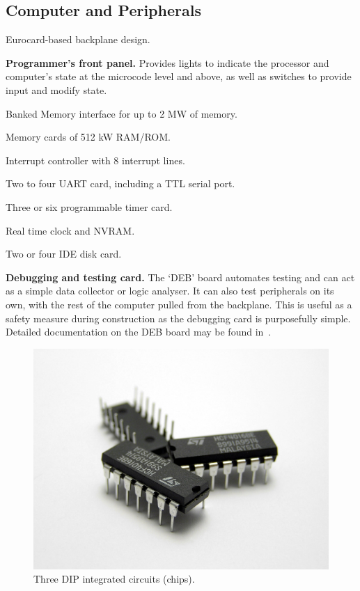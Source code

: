 \subsection{Computer and Peripherals}

\begin{description}
\item Eurocard-based backplane design.
\item \textbf{Programmer's front panel.} Provides lights to indicate
  the processor and computer's state at the microcode level and above,
  as well as switches to provide input and modify state.
\item Banked Memory interface for up to 2 MW of memory.
\item Memory cards of 512 kW RAM/ROM.
\item Interrupt controller with 8 interrupt lines.
\item Two to four UART card, including a TTL serial port.
\item Three or six programmable timer card.
\item Real time clock and NVRAM.
\item Two or four IDE disk card.
\item \textbf{Debugging and testing card.} The ‘\gls{DEB}’ board automates
  testing and can act as a simple data collector or logic analyser. It can also
  test peripherals on its own, with the rest of the computer pulled from the
  backplane. This is useful as a safety measure during construction as the
  debugging card is purposefully simple. Detailed documentation on the
  \gls{DEB} board may be found in~.
\end{description}

\begin{figure}
  \centering
  \includegraphics[width=0.5\columnwidth]{figs/Three_IC_circuit_chips.JPG}
  \caption{Three DIP integrated circuits (chips).}
\end{figure}


